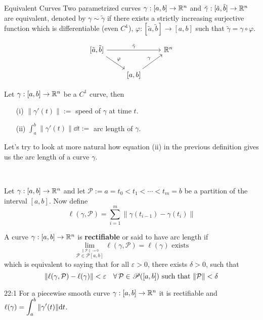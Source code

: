 \documentclass[../Analysis-3.tex]{subfiles}
\begin{document}
\begin{Def}{Equivalent Curves}{}
  Two parametrized curves $\gamma : [a,b] \to \mathbb{R}^n$ and $\tilde{\gamma} : [\tilde{a}, \tilde{b}] \to \mathbb{R}^n$ are equivalent, denoted by $\gamma \sim \tilde{\gamma}$ if there exists a strictly increasing surjective function which is differentiable (even $C^1$), $\varphi : [\tilde{a},\tilde{b}] \to [a,b]$ such that $\tilde{\gamma} = \gamma \circ \varphi$.

  \[\begin{tikzcd}
      {[\tilde{a}, \tilde{b}]} && {\R^n} \\
      & {[a, b]}
      \arrow["\varphi", from=1-1, to=2-2]
      \arrow["\gamma", from=2-2, to=1-3]
      \arrow["{\tilde{\gamma}}", from=1-1, to=1-3]
    \end{tikzcd}\]
\end{Def}

\begin{Def}{}{}
  Let $\gamma : [a,b] \to \mathbb{R}^n$ be a $C^1$ curve, then
  \begin{enumerate}
    \item[(i)] $\| \gamma'(t) \| :=$ speed of $\gamma$ at time $t$.
    \item[(ii)] $\displaystyle\int_a^b \| \gamma'(t) \| \dd t :=$ arc length of $\gamma$.
  \end{enumerate}
\end{Def}

Let's try to look at more natural how equation (ii) in the previous definition gives us the arc length of a curve $\gamma$.

\

Let $\gamma : [a,b] \to \mathbb{R}^n$ and let $\mathcal{P} := a = t_0 < t_1 < \cdots < t_m = b $ be a partition of the interval $[a,b]$. Now define
\[
  \ell(\gamma,\mathcal{P}) = \sum_{i=1}^m \| \gamma(t_{i-1}) - \gamma(t_i) \|
\]


\begin{Def}{}{}
  A curve $\gamma : [a,b] \to \mathbb{R}^n$ is \textbf{rectifiable} or said to have arc length if
  \[
    \lim_{\overset{\|\mathcal{P}\| \to 0}{\mathcal{P} \in \mathscr{P}[a,b]}} \ell(\gamma,\mathcal{P}) = \ell(\gamma) \mbox{ exists}
  \]
  which is equivalent to saying that for all $\varepsilon > 0$, there exists $\delta >0$, such that
  \[
    \norm{\ell(\gamma,\mathcal{P}) - \ell(\gamma)} < \varepsilon \quad \forall \, \mathcal{P} \in \mathscr{P}([a,b]) \mbox{ such that } \norm{\mathcal{P}} < \delta
  \]
\end{Def}

\begin{Thm}{}{22:1}
  For a piecewise smooth curve $\gamma : [a,b] \to \mathbb{R}^n$ it is rectifiable and $\ell(\gamma) = \displaystyle\int_a^b \norm{\gamma'(t)} \dd t $.
\end{Thm}
\end{document}
